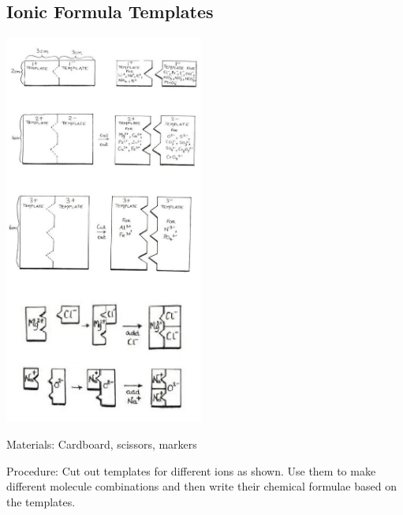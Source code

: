 \begin{multicols}{2}
\columnbreak

\subsection{Ionic Formula Templates}

\begin{center}
\includegraphics[width=0.49\textwidth]{./img/source/ion-templates.jpg}
\end{center}

\begin{description*}
\item[Materials:]{Cardboard, scissors, markers}
\item[Procedure:]{Cut out templates for different ions as shown. Use them to make different molecule combinations and then write their chemical formulae based on the templates.}
\end{description*}


\end{multicols}
